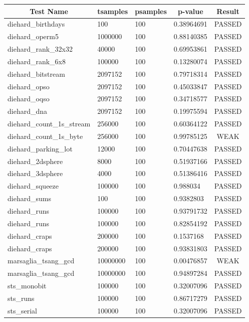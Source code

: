 \documentclass[titlepage, 11pt]{article}
\begin{document}
\begin{table}[!htb]
\begin{tabular}{l|l|l|l|c}
\hline
\multicolumn{1}{c|}{\textbf{Test Name}} & \multicolumn{1}{c|}{\textbf{tsamples}} & \multicolumn{1}{c|}{\textbf{psamples}} & \multicolumn{1}{c|}{\textbf{p-value}} & \textbf{Result} \\ \hline
diehard\_birthdays & 100 & 100 & 0.38964691 & PASSED \\
diehard\_operm5 & 1000000 & 100 & 0.88140385 & PASSED \\
diehard\_rank\_32x32 & 40000 & 100 & 0.69953861 & PASSED \\
diehard\_rank\_6x8 & 100000 & 100 & 0.13280074 & PASSED \\
diehard\_bitstream & 2097152 & 100 & 0.79718314 & PASSED \\
diehard\_opso & 2097152 & 100 & 0.45033847 & PASSED \\
diehard\_oqso & 2097152 & 100 & 0.34718577 & PASSED \\
diehard\_dna & 2097152 & 100 & 0.19975594 & PASSED \\
diehard\_count\_1s\_stream & 256000 & 100 & 0.60364122 & PASSED \\
diehard\_count\_1s\_byte & 256000 & 100 & 0.99785125 & WEAK \\
diehard\_parking\_lot & 12000 & 100 & 0.70447638 & PASSED \\
diehard\_2dsphere & 8000 & 100 & 0.51937166 & PASSED \\
diehard\_3dsphere & 4000 & 100 & 0.51386416 & PASSED \\
diehard\_squeeze & 100000 & 100 & 0.988034 & PASSED \\
diehard\_sums & 100 & 100 & 0.9382803 & PASSED \\
diehard\_runs & 100000 & 100 & 0.93791732 & PASSED \\
diehard\_runs & 100000 & 100 & 0.82854192 & PASSED \\
diehard\_craps & 200000 & 100 & 0.1537168 & PASSED \\
diehard\_craps & 200000 & 100 & 0.93831803 & PASSED \\
marsaglia\_tsang\_gcd & 10000000 & 100 & 0.00476857 & WEAK \\
marsaglia\_tsang\_gcd & 10000000 & 100 & 0.94897284 & PASSED \\
sts\_monobit & 100000 & 100 & 0.32007096 & PASSED \\
sts\_runs & 100000 & 100 & 0.86717279 & PASSED \\
sts\_serial & 100000 & 100 & 0.32007096 & PASSED \\

\end{tabular}
\end{table}
\end{document}
